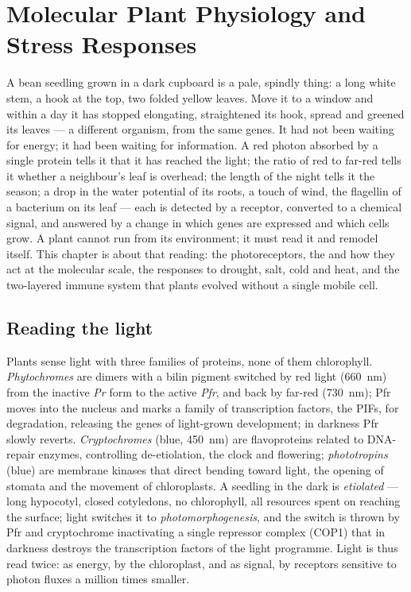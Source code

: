 \chapter{Molecular Plant Physiology and Stress Responses}\label{ch:b3:plant-molecular-physiology}

A bean seedling grown in a dark cupboard is a pale, spindly thing: a
long white stem, a hook at the top, two folded yellow leaves. Move it
to a window and within a day it has stopped elongating, straightened
its hook, spread and greened its leaves --- a different organism, from
the same genes. It had not been waiting for energy; it had been waiting
for information. A red photon absorbed by a single protein tells it
that it has reached the light; the ratio of red to far-red tells it
whether a neighbour's leaf is overhead; the length of the night tells
it the season; a drop in the water potential of its roots, a touch of
wind, the flagellin of a bacterium on its leaf --- each is detected by a
receptor, converted to a chemical signal, and answered by a change in
which genes are expressed and which cells grow. A plant cannot run
from its environment; it must read it and remodel itself. This chapter
is about that reading: the photoreceptors, the  and how they
act at the molecular scale, the responses to drought, salt, cold and
heat, and the two-layered immune system that plants evolved without a
single mobile cell.

\section{Reading the light}

\begin{definition}[Photoreceptors]\label{def:b3:plant-molecular-physiology:photoreceptors}
Plants sense light with three families of proteins, none of them
chlorophyll. \emph{Phytochromes} are dimers with a bilin pigment
switched by red light (\qty{660}{nm}) from the inactive \emph{Pr} form
to the active \emph{Pfr}, and back by far-red (\qty{730}{nm}); Pfr
moves into the nucleus and marks a family of transcription factors, the
PIFs, for degradation, releasing the genes of light-grown development;
in darkness Pfr slowly reverts. \emph{Cryptochromes} (blue,
\qty{450}{nm}) are flavoproteins related to DNA-repair enzymes,
controlling de-etiolation, the clock and flowering; \emph{phototropins}
(blue) are membrane kinases that direct bending toward light, the
opening of stomata and the movement of chloroplasts. A seedling in the
dark is \emph{etiolated} --- long hypocotyl, closed cotyledons, no
chlorophyll, all resources spent on reaching the surface; light
switches it to \emph{photomorphogenesis}, and the switch is thrown by
Pfr and cryptochrome inactivating a single repressor complex (COP1)
that in darkness destroys the transcription factors of the light
programme. Light is thus read twice: as energy, by the chloroplast, and
as signal, by receptors sensitive to photon fluxes a million times
smaller.
\end{definition}

